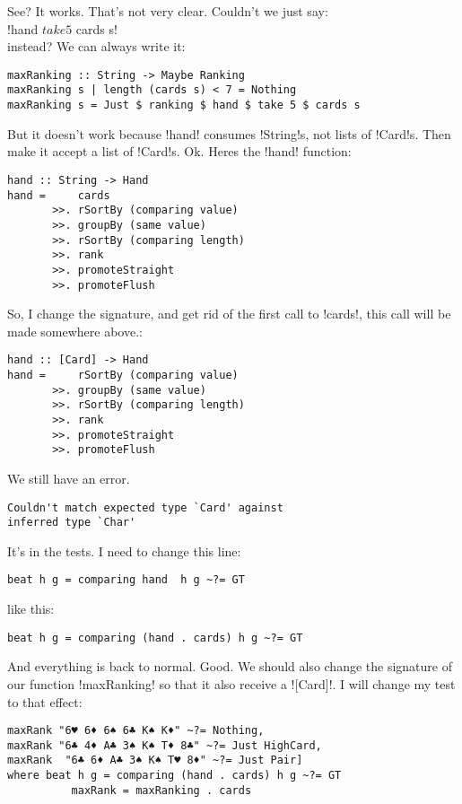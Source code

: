 \success See? It works.
\lhN That's not very clear. Couldn't we just say:\\ \il!hand $ take 5 $ cards s! \\ instead?  
\lhA We can always write it:
\begin{lstlisting}[frame=single]
maxRanking :: String -> Maybe Ranking
maxRanking s | length (cards s) < 7 = Nothing
maxRanking s = Just $ ranking $ hand $ take 5 $ cards s
\end{lstlisting}
\error But it doesn't work because \il!hand! consumes \il!String!s, not lists of \il!Card!s.
\lhN Then make it accept a list of \il!Card!s.
\lhA \error Ok. Heres the \il!hand! function:
\begin{lstlisting}[frame=single]
hand :: String -> Hand
hand =     cards
       >>. rSortBy (comparing value)
       >>. groupBy (same value)
       >>. rSortBy (comparing length)
       >>. rank
       >>. promoteStraight
       >>. promoteFlush    
\end{lstlisting}
\error So, I change the signature, and get rid of the first call to \il!cards!, this call will be made somewhere above.:
\begin{lstlisting}[frame=single]
hand :: [Card] -> Hand
hand =     rSortBy (comparing value)
       >>. groupBy (same value)
       >>. rSortBy (comparing length)
       >>. rank
       >>. promoteStraight
       >>. promoteFlush    
\end{lstlisting}         
\error We still have an error.
\lhN
\begin{small}
\begin{verbatim} 
Couldn't match expected type `Card' against 
inferred type `Char'
\end{verbatim}
\end{small}
It's in the tests. I need to change this line:
\begin{lstlisting}[frame=single]
beat h g = comparing hand  h g ~?= GT
\end{lstlisting}
like this:
\begin{lstlisting}[frame=single]
beat h g = comparing (hand . cards) h g ~?= GT
\end{lstlisting}
\success And everything is back to normal.
\lhA Good.
\lhN We should also change the signature of our function \il!maxRanking! so that it also receive a \il![Card]!.
I will change my test to that effect:
\begin{lstlisting}[frame=single]
maxRank "6♥ 6♦ 6♠ 6♣ K♠ K♦" ~?= Nothing,
maxRank "6♣ 4♦ A♣ 3♠ K♠ T♦ 8♣" ~?= Just HighCard,
maxRank  "6♣ 6♦ A♣ 3♠ K♠ T♥ 8♦" ~?= Just Pair]
where beat h g = comparing (hand . cards) h g ~?= GT
          maxRank = maxRanking . cards 
\end{lstlisting}
